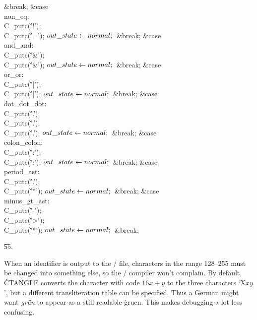 \&{break};\6
\4\&{case} \\{non\_eq}:\5
\\{C\_putc}(\.{'!'});\5
\\{C\_putc}(\.{'='});\6
${}\\{out\_state}\leftarrow\\{normal};{}$\6
\&{break};\6
\4\&{case} \\{and\_and}:\5
\\{C\_putc}(\.{'\&'});\5
\\{C\_putc}(\.{'\&'});\6
${}\\{out\_state}\leftarrow\\{normal};{}$\6
\&{break};\6
\4\&{case} \\{or\_or}:\5
\\{C\_putc}(\.{'|'});\5
\\{C\_putc}(\.{'|'});\6
${}\\{out\_state}\leftarrow\\{normal};{}$\6
\&{break};\6
\4\&{case} \\{dot\_dot\_dot}:\5
\\{C\_putc}(\.{'.'});\5
\\{C\_putc}(\.{'.'});\5
\\{C\_putc}(\.{'.'});\6
${}\\{out\_state}\leftarrow\\{normal};{}$\6
\&{break};\6
\4\&{case} \\{colon\_colon}:\5
\\{C\_putc}(\.{':'});\5
\\{C\_putc}(\.{':'});\6
${}\\{out\_state}\leftarrow\\{normal};{}$\6
\&{break};\6
\4\&{case} \\{period\_ast}:\5
\\{C\_putc}(\.{'.'});\5
\\{C\_putc}(\.{'*'});\6
${}\\{out\_state}\leftarrow\\{normal};{}$\6
\&{break};\6
\4\&{case} \\{minus\_gt\_ast}:\5
\\{C\_putc}(\.{'-'});\5
\\{C\_putc}(\.{'>'});\5
\\{C\_putc}(\.{'*'});\6
${}\\{out\_state}\leftarrow\\{normal};{}$\6
\&{break};\par
\U55.\fi

When an identifier is output to the \CEE/ file, characters in the
range 128--255 must be changed into something else, so the \CEE/
compiler won't complain.  By default, \.{CTANGLE} converts the
character with code $16 x+y$ to the three characters `\.X$xy$', but
a different transliteration table can be specified.  Thus a German
might want {\it gr\"un\/} to appear as a still readable \.{gruen}.
This makes debugging a lot less confusing.

